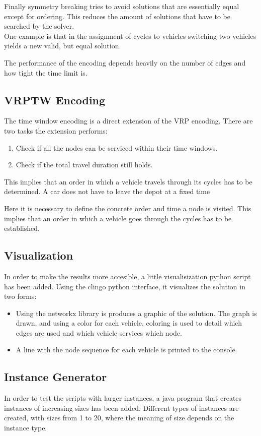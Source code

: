 \documentclass[12pt, letterpaper]{article}
\begin{document}
Finally symmetry breaking tries to avoid solutions that are essentially equal except for ordering. This reduces the amount of solutions that have to be searched by the solver.\\
One example is that in the assignment of cycles to vehicles switching two vehicles yields a new valid, but equal solution.

The performance of the encoding depends heavily on the number of edges and how tight the time limit is.

\subsection{VRPTW Encoding}
The time window encoding is a direct extension of the VRP encoding. There are two tasks the extension performs:
\begin{enumerate}
	\item Check if all the nodes can be serviced within their time windows.
	\item Check if the total travel duration still holds.
\end{enumerate}

This implies that an order in which a vehicle travels through its cycles has to be determined. A car does not have to leave the depot at a fixed time

Here it is necessary to define the concrete order and time a node is visited. This implies that an order in which a vehicle goes through the cycles has to be established.\\


\subsection{Visualization}
In order to make the results more accesible, a little visualisization python script has been added. Using the clingo python interface, it visualizes the solution in two forms:
\begin{itemize}
	\item Using the networkx library is produces a graphic of the solution. The graph is drawn, and using a color for each vehicle, coloring is used to detail which edges are used and which vehicle services which node.
	\item A line with the node sequence for each vehicle is printed to the console.
\end{itemize}


\subsection{Instance Generator}
In order to test the scripts with larger instances, a java program that creates instances of increasing sizes has been added. Different types of instances are created, with sizes from 1 to 20, where the meaning of size depends on the instance type.
\end{document}
